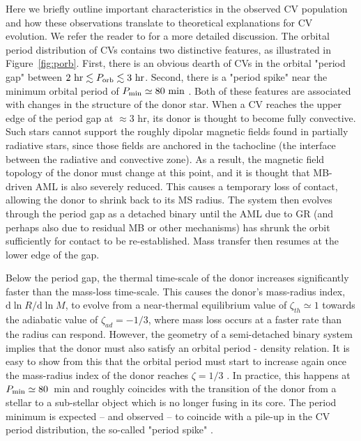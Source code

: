 \documentclass[fleqn,usenatbib]{mnras}
\begin{document}
Here we briefly outline important characteristics in the observed CV population and how these observations translate to theoretical explanations for CV evolution. We refer the reader to \citet{knigge11} for a more detailed discussion. The orbital period distribution of CVs contains two distinctive features, as illustrated in Figure~\ref{fig:porb}. First, there is an obvious dearth of CVs in the orbital "period gap" between $2~\mathrm{hr} \lesssim P_{\rm{orb}} \lesssim 3~\mathrm{hr}$. Second, there is a "period spike" near the minimum orbital period of $P_{\rm min} \simeq 80~\mathrm{min}$ \citep[e.g.][]{gansicke09}. Both of these features are associated with changes in the structure of the donor star. When a CV reaches the upper edge of the period gap at $\approx 3$ hr, its donor is thought to become fully convective. Such stars cannot support the roughly dipolar magnetic fields found in partially radiative stars, since those fields are anchored in the tachocline (the interface between the radiative and convective zone). As a result, the magnetic field topology of the donor must change at this point, and it is thought that MB-driven AML is also severely reduced. This causes a temporary loss of contact, allowing the donor to shrink back to its MS radius. The system then evolves through the period gap as a detached binary until the AML due to GR (and perhaps also due to residual MB or other mechanisms) has shrunk the orbit sufficiently for contact to be re-established. Mass transfer then resumes at the lower edge of the gap.

Below the period gap, the thermal time-scale of the donor increases significantly faster than the mass-loss time-scale. This causes the donor's mass-radius index, $\mathrm{d}\ln R/\mathrm{d}\ln M$, to evolve from a near-thermal equilibrium value of $\zeta_{th} \simeq 1$ towards the adiabatic value of $\zeta_{ad} = -1/3$, where mass loss occurs at a faster rate than the radius can respond. However, the geometry of a semi-detached binary system implies that the donor must also satisfy an orbital period - density relation. It is easy to show from this that the orbital period must start to increase again once the mass-radius index of the donor reaches $\zeta = 1/3$ \citep[see e.g.][]{knigge11}. In practice, this happens at $P_{\rm{min}} \simeq 80$~min and roughly coincides with the transition of the donor from a stellar to a sub-stellar object which is no longer fusing in its core. The period minimum is expected -- and observed -- to coincide with a pile-up in the CV period distribution, the so-called "period spike" \citep[][]{gansicke09}.
\end{document}
